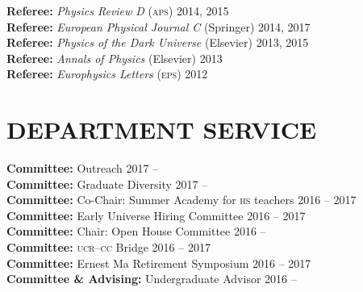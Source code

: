 \documentclass[margin,line]{resume}
\newcommand{\scap}[1]{\textsc{\MakeLowercase{#1}}}
\begin{document}
\begin{resume}
\textbf{Referee:} \emph{Physics Review D} (\scap{APS})
\hfill 2014, 2015\vspace{.3mm}\\
%
\textbf{Referee:} \emph{European Physical Journal C} (Springer)
\hfill 2014, 2017\vspace{.3mm}\\
%
\textbf{Referee:} \emph{Physics of the Dark Universe} (Elsevier)
\hfill 2013, 2015\vspace{.3mm}\\
%
\textbf{Referee:}  \emph{Annals of Physics} (Elsevier)
\hfill 2013\vspace{.3mm}\\
%
\textbf{Referee:} \emph{Europhysics Letters} (\scap{EPS})
\hfill 2012\vspace{.3mm}%




\section{\footnotesize \sc
\sffamily 
{}DEPARTMENT SERVICE
}


\textbf{Committee:}  Outreach
\hfill 2017 -- \phantom{2017}\vspace{.3mm}\\
%
\textbf{Committee:}  Graduate Diversity
\hfill 2017 -- \phantom{2017}\vspace{.3mm}\\
%
\textbf{Committee:}  Co-Chair: Summer Academy for \scap{HS} teachers
\hfill 2016 -- {2017}\vspace{.3mm}\\
%
\textbf{Committee:}  Early Universe Hiring Committee
\hfill 2016 -- 2017\vspace{.3mm}\\
%
\textbf{Committee:}  Chair: Open House Committee
\hfill 2016 -- \phantom{2017}\vspace{.3mm}\\
%
\textbf{Committee:}  \scap{UCR}--\scap{CC} Bridge
\hfill 2016 -- 2017\vspace{.3mm}\\
%
\textbf{Committee:}  Ernest Ma Retirement Symposium
\hfill 2016 -- 2017\vspace{.3mm}\\
%
\textbf{Committee \& Advising:} Undergraduate Advisor
\hfill 2016 -- \phantom{2017}\vspace{.3mm}%






\end{resume}
\end{document}
